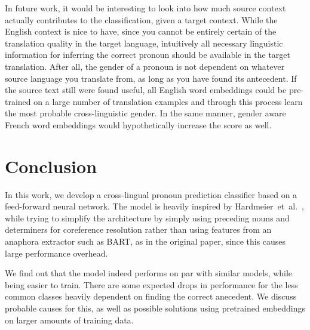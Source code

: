 \documentclass[11pt]{article}
\begin{document}
In future work, it would be interesting to look into how much source context actually contributes to the classification, given a target context.
While the English context is nice to have, since you cannot be entirely certain of the translation quality in the target language, intuitively all necessary linguistic information for inferring the correct pronoun should be available in the target translation.
After all, the gender of a pronoun is not dependent on whatever source language you translate from, as long as you have found its antecedent.
If the source text still were found useful, all English word embeddings could be pre-trained on a large number of translation examples and through this process learn the most probable cross-linguistic gender.
In the same manner, gender aware French word embeddings would hypothetically increase the score as well.

\section{Conclusion}

In this work, we develop a cross-lingual pronoun prediction classifier based on a feed-forward neural network.
The model is heavily inspired by Hardmeier~et~al.~, while trying to simplify the architecture by simply using preceding nouns and determiners for coreference resolution rather than using features from an anaphora extractor such as BART, as in the original paper, since this causes large performance overhead.

We find out that the model indeed performs on par with similar models, while being easier to train.
There are some expected drops in performance for the less common classes heavily dependent on finding the correct anecedent.
We discuss probable causes for this, as well as possible solutions using pretrained embeddings on larger amounts of training data.



\end{document}
